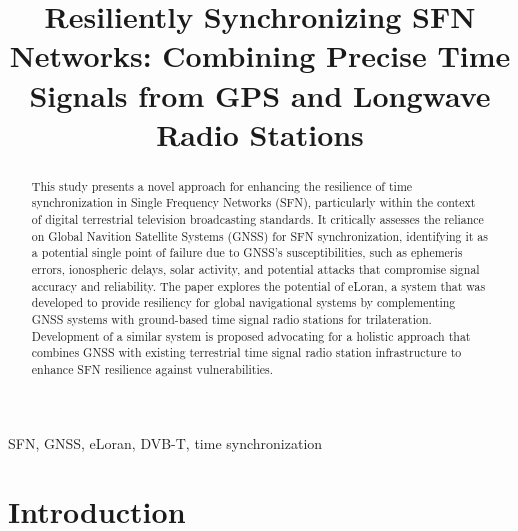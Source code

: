 \documentclass[conference]{IEEEtran}
\begin{document}
\title{Resiliently Synchronizing SFN Networks: Combining Precise Time Signals from GPS and Longwave Radio Stations}

\author{
}

\maketitle

\begin{abstract}
This study presents a novel approach for enhancing the resilience of time
synchronization in Single Frequency Networks (SFN), particularly within the
context of digital terrestrial television broadcasting standards. It
critically assesses the reliance on Global Navition Satellite Systems
(GNSS) for SFN synchronization, identifying it as a potential single point
of failure due to GNSS's susceptibilities, such as ephemeris errors,
ionospheric delays, solar activity, and potential attacks that compromise
signal accuracy and reliability. The paper explores the potential of
eLoran, a system that was developed to provide resiliency for global
navigational systems by complementing GNSS systems with ground-based time
signal radio stations for trilateration. Development of a similar system is
proposed advocating for a holistic approach that combines GNSS with
existing terrestrial time signal radio station infrastructure to enhance
SFN resilience against vulnerabilities.
\end{abstract}

\begin{IEEEkeywords}
SFN, GNSS, eLoran, DVB-T, time synchronization
\end{IEEEkeywords}

\section{Introduction}
\end{document}
